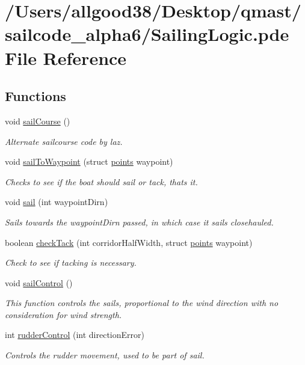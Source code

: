 \hypertarget{_sailing_logic_8pde}{
\section{/\-Users/allgood38/\-Desktop/qmast/sailcode\-\_\-alpha6/\-Sailing\-Logic.pde \-File \-Reference}
\label{_sailing_logic_8pde}
}
\subsection*{\-Functions}
\begin{DoxyCompactItemize}
\item 
void \hyperlink{_sailing_logic_8pde_aeaba10e3002bd9b9fd2ea1bdd5ab97ea}{sail\-Course} ()
\begin{DoxyCompactList}\small\item\em \-Alternate sailcourse code by laz. \end{DoxyCompactList}\item 
void \hyperlink{_sailing_logic_8pde_a42829044eaaf781783f525dbf35eabc1}{sail\-To\-Waypoint} (struct \hyperlink{structpoints}{points} waypoint)
\begin{DoxyCompactList}\small\item\em \-Checks to see if the boat should sail or tack, thats it. \end{DoxyCompactList}\item 
void \hyperlink{_sailing_logic_8pde_a8e7082b5e8ca95936e2afa33af9f6835}{sail} (int waypoint\-Dirn)
\begin{DoxyCompactList}\small\item\em \-Sails towards the waypoint\-Dirn passed, in which case it sails closehauled. \end{DoxyCompactList}\item 
boolean \hyperlink{_sailing_logic_8pde_a1acad42611d693fa074f7dae5e5a5e3f}{check\-Tack} (int corridor\-Half\-Width, struct \hyperlink{structpoints}{points} waypoint)
\begin{DoxyCompactList}\small\item\em \-Check to see if tacking is necessary. \end{DoxyCompactList}\item 
void \hyperlink{_sailing_logic_8pde_aae8de392da41d229212d9943d965690c}{sail\-Control} ()
\begin{DoxyCompactList}\small\item\em \-This function controls the sails, proportional to the wind direction with no consideration for wind strength. \end{DoxyCompactList}\item 
int \hyperlink{_sailing_logic_8pde_aad7e4cc1e18478540e9c1d8c00390d24}{rudder\-Control} (int direction\-Error)
\begin{DoxyCompactList}\small\item\em \-Controls the rudder movement, used to be part of sail. \end{DoxyCompactList}\end{DoxyCompactItemize}


